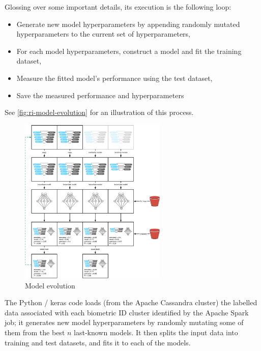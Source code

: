 \documentclass[a4paper, 10 pt, conference]{IEEEtran}
\begin{document}
Glossing over some important details, its execution is the following loop:

\begin{itemize}
\item Generate new model hyperparameters by appending randomly mutated hyperparameters to the current set of hyperparameters,
\item For each model hyperparameters, construct a model and fit the training dataset,
\item Measure the fitted model's performance using the test dataset,
\item Save the measured performance and hyperparameters
\end{itemize}

See \autoref{fig:ri-model-evolution} for an illustration of this process.

\begin{figure}[h]
    \begin{center}
        \caption{Model evolution}
        \label{fig:ri-model-evolution}
        \includegraphics[width=7cm,keepaspectratio]{ri-model-evolution.png}
    \end{center}
\end{figure}

The Python / keras \cite{keras} code loads (from the Apache Cassandra cluster) the labelled data associated with each biometric ID cluster identified by the Apache Spark job; it generates new model hyperparameters by randomly mutating some of them from the best $n$ last-known models. It then splits the input data into training and test datasets, and fits it to each of the models. 
\end{document}
